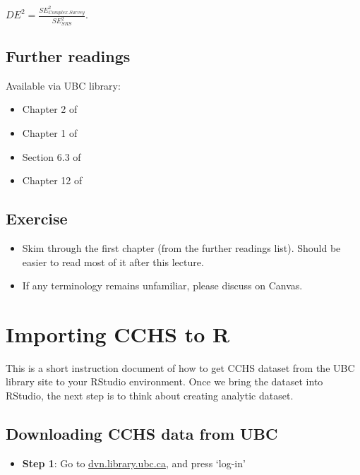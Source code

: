 \documentclass[
]{book}
\providecommand{\tightlist}{%
  \setlength{\itemsep}{0pt}\setlength{\parskip}{0pt}}
\begin{document}
\(DE^2 = \frac{SE^2_{Complex.Survey}}{SE^2_{SRS}}\).

\hypertarget{further-readings}{%
\section{Further readings}\label{further-readings}}

Available via UBC library:

\begin{itemize}
\tightlist
\item
  Chapter 2 of \citet{heeringa2017applied}
\item
  Chapter 1 of \citet{lumley2011complex}
\item
  Section 6.3 of \citet{bilder2014analysis}
\item
  Chapter 12 of \citet{vittinghoff2011regression}
\end{itemize}

\hypertarget{exercise}{%
\section{Exercise}\label{exercise}}

\begin{itemize}
\tightlist
\item
  Skim through the first chapter (from the further readings list). Should be easier to read most of it after this lecture.
\item
  If any terminology remains unfamiliar, please discuss on Canvas.
\end{itemize}

\hypertarget{importing-cchs-to-r}{%
\chapter{Importing CCHS to R}\label{importing-cchs-to-r}}

This is a short instruction document of how to get CCHS dataset from the UBC library site to your RStudio environment. Once we bring the dataset into RStudio, the next step is to think about creating analytic dataset.

\hypertarget{downloading-cchs-data-from-ubc}{%
\section{Downloading CCHS data from UBC}\label{downloading-cchs-data-from-ubc}}

\begin{itemize}
\tightlist
\item
  \textbf{Step 1}: Go to \href{http://dvn.library.ubc.ca}{dvn.library.ubc.ca}, and press `log-in'
\end{itemize}
\end{document}
